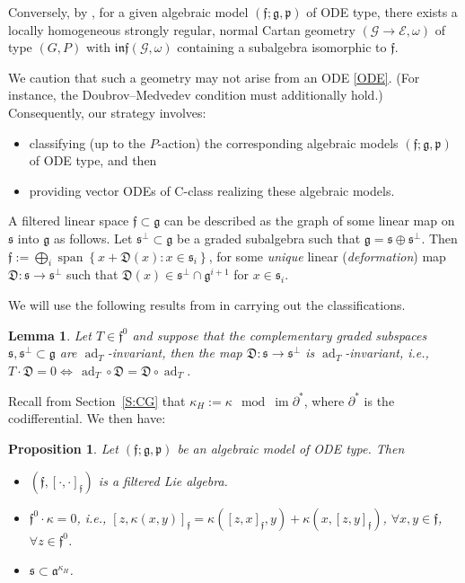 \documentclass[10pt,a4paper]{amsart}
\DeclareMathOperator{\img}{im}
\DeclareMathOperator{\sn}{span}
\newcommand\fD{\mathfrak{D}}
\newcommand{\g}{\mathfrak{g}}
\newcommand\ad{\operatorname{ad}}
\newcommand\cG{\mathcal{G}}
\newcommand\fa{\mathfrak{a}}
\newcommand\ff{\mathfrak{f}}
\newcommand\finf{\mathfrak{inf}}
\newcommand\fp{\mathfrak{p}}
\newcommand\fs{\mathfrak{s}}
\newcommand\cE{\mathcal{E}}
\numberwithin{equation}{section}
\newtheorem{Lemma}[Theorem]{Lemma}
\newtheorem{Proposition}[Theorem]{Proposition}
 { \theoremstyle{definition}
\newtheorem{Definition}[Theorem]{Definition}
\newtheorem{Note}[Theorem]{Note}
\newtheorem{Example}[Theorem]{Example}
\newtheorem{Remark}[Theorem]{Remark} }
\begin{document}
\begin{Remark}\label{R:Strategy}
 Conversely, by \cite[Lemma~4.1.4]{KT2017}, for a given algebraic model $(\ff; \g, \fp)$ of ODE type, there exists a locally homogeneous strongly regular, normal Cartan geometry $(\cG \to \cE, \omega)$ of type $(G,P)$ with $\finf(\cG, \omega)$ containing a subalgebra isomorphic to $\ff$.

 We caution that such a geometry may not arise from an ODE \eqref{ODE}. (For instance, the Doubrov--Medvedev condition must additionally hold.) Consequently, our strategy involves:
\begin{itemize}\itemsep=0pt
\item[(i)] classifying (up to the $P$-action) the corresponding algebraic models $(\ff;\g,\fp)$ of ODE type, and then
\item[(ii)] providing vector ODEs of C-class realizing these algebraic models.
\end{itemize}
\end{Remark}

A filtered linear space $\ff \subset \g$ can be described as the graph of some linear map on $\fs$ into $\g$ as follows. Let $\fs^\perp \subset \g$ be a graded subalgebra such that $\g = \fs \oplus \fs^\perp$. Then
$\ff := \bigoplus_i \sn\left\{ x + \fD(x) : x \in \fs_i \right\}$,
for some {\em unique} linear ({\em deformation}) map $\fD : \fs \to \fs^\perp$ such that $\fD(x) \in \fs^\perp \cap \g^{i+1}$ for $x \in \fs_i$.


We will use the following results from \cite[Section~A.1]{KT2021} in carrying out the classifications.

\begin{Lemma} \label{L:f0}
Let $T \in \ff^0$ and suppose that the complementary graded subspaces $\fs, \fs^\perp \subset \g$ are $\ad_T$-invariant, then the map $\fD\colon \fs \to \fs^\perp$ is $\ad_T$-invariant, i.e., $T\cdot \fD = 0 \iff \, \ad_T \circ \fD = \fD \circ \ad_T$.
\end{Lemma}

Recall from Section~\ref{S:CG} that $\kappa_H := \kappa \mod \img \partial^*$, where $\partial^*$ is the codifferential. We then have:
\begin{Proposition} \label{P:AM}
Let $(\ff; \g, \fp)$ be an algebraic model of ODE type. Then
\begin{itemize}\itemsep=0pt
\item [$(i)$] $(\ff, [\cdot,\cdot]_\ff)$ is a filtered Lie algebra.
\item [$(ii)$] $\ff^0 \cdot \kappa = 0$, i.e., $[z,\kappa(x,y)]_\ff = \kappa([z,x]_\ff,y) + \kappa(x,[z,y]_\ff)$, $\forall x,y \in \ff$, $\forall z \in \ff^0$.
\item [$(iii)$] $\fs \subset \fa^{\kappa_H}$.
\end{itemize}
\end{Proposition}
\end{document}
